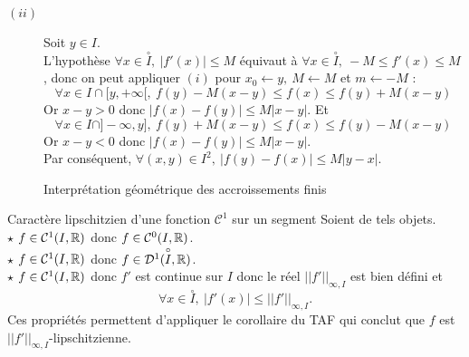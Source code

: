 \documentclass{article}
\begin{document}
\begin{question_kholle}
\begin{description}
		\item[$(ii)$] Soit $y \in I.$\\
		      L'hypothèse $\forall x\in \overset{\circ}{I}, \ |f'(x)|\leq M$ équivaut à $\forall x \in \overset{\circ}{I}, \ -M \leq f'(x) \leq M$, donc on peut appliquer $(i)$ pour $x_0 \gets y, \ M \gets M$ et $m\gets -M$ : $$\forall x \in I\cap [y, +\infty [,  \ f(y) -M(x-y) \leq f(x) \leq f(y) + M(x-y)$$
						      Or $x-y >0$ donc $|f(x) -f(y) | \leq M|x-y|$.
						      Et $$\forall x \in I\cap ]-\infty, y ],  \ f(y) +M(x-y) \leq f(x) \leq f(y) - M(x-y)$$
		      Or $x-y < 0$ donc $|f(x) -f(y) | \leq M|x-y|$. \\
		      Par conséquent, $\forall (x,y)\in I^2, \ |f(y) -f(x)| \leq M|y-x|.$
	\end{description}

	{\begin{figure}[!h]
		\centering
		\caption{Interprétation géométrique des accroissements finis}
	\end{figure}}
\end{question_kholle}


\begin{question_kholle}
	{Caractère lipschitzien d'une fonction $\mathcal{C}^1$ sur un segment}
	Soient de tels objets. \\
	$\star$ $f\in \mathcal{C}^1(I, \mathbb R)$ donc $f\in \mathcal{C}^0(I, \mathbb R)$. \\
	$\star$ $f\in \mathcal{C}^1(I,\mathbb R)$ donc $f\in \mathcal{D}^1(\overset{\circ}{I}, \mathbb R)$.\\
	$\star$ $f\in \mathcal{C}^1(I,\mathbb R)$ donc $f'$ est continue sur $I$ donc le réel $||f'||_{\infty,I}$ est bien défini et $$\forall  x \in \overset{\circ}{I}, \ |f'(x)| \leq ||f'||_{\infty,I}.$$ Ces propriétés permettent d'appliquer le corollaire du TAF qui conclut que $f$ est $||f'||_{\infty,I}$-lipschitzienne.
\end{question_kholle}
\end{document}
